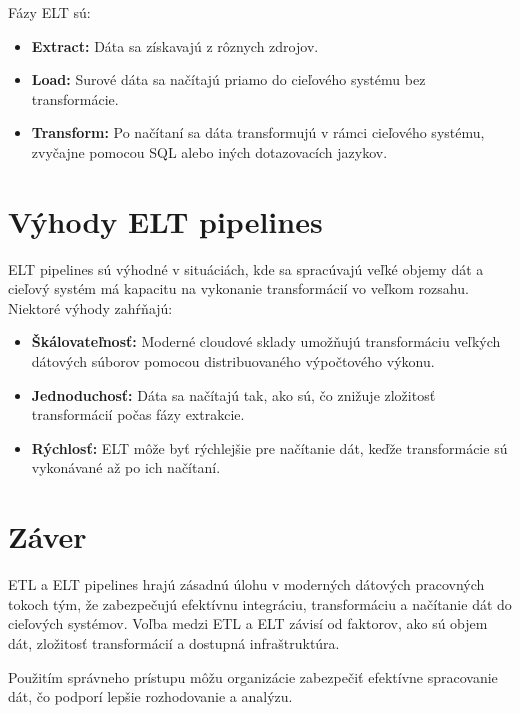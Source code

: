 \documentclass{article}
\begin{document}
Fázy ELT sú:

\begin{itemize}
    \item \textbf{Extract:} Dáta sa získavajú z rôznych zdrojov.
    \item \textbf{Load:} Surové dáta sa načítajú priamo do cieľového systému bez transformácie.
    \item \textbf{Transform:} Po načítaní sa dáta transformujú v rámci cieľového systému, zvyčajne pomocou SQL alebo iných dotazovacích jazykov.
\end{itemize}

\section{Výhody ELT pipelines}

ELT pipelines sú výhodné v situáciách, kde sa spracúvajú veľké objemy dát a cieľový systém má kapacitu na vykonanie transformácií vo veľkom rozsahu. Niektoré výhody zahŕňajú:

\begin{itemize}
    \item \textbf{Škálovateľnosť:} Moderné cloudové sklady umožňujú transformáciu veľkých dátových súborov pomocou distribuovaného výpočtového výkonu.
    \item \textbf{Jednoduchosť:} Dáta sa načítajú tak, ako sú, čo znižuje zložitosť transformácií počas fázy extrakcie.
    \item \textbf{Rýchlosť:} ELT môže byť rýchlejšie pre načítanie dát, keďže transformácie sú vykonávané až po ich načítaní.
\end{itemize}

\section{Záver}

ETL a ELT pipelines hrajú zásadnú úlohu v moderných dátových pracovných tokoch tým, že zabezpečujú efektívnu integráciu, transformáciu a načítanie dát do cieľových systémov. Voľba medzi ETL a ELT závisí od faktorov, ako sú objem dát, zložitosť transformácií a dostupná infraštruktúra.

Použitím správneho prístupu môžu organizácie zabezpečiť efektívne spracovanie dát, čo podporí lepšie rozhodovanie a analýzu.
\end{document}
